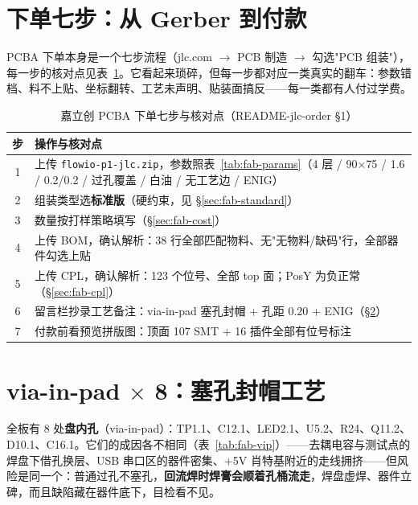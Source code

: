\section{下单七步：从 Gerber 到付款}
\label{sec:fab-steps}

PCBA 下单本身是一个七步流程（jlc.com $\to$ PCB 制造 $\to$ 勾选"PCB 组装"），每一步的核对点见表~\ref{tab:fab-steps}。它看起来琐碎，但每一步都对应一类真实的翻车：参数错档、料不上贴、坐标翻转、工艺未声明、贴装面搞反——每一类都有人付过学费。

\begin{table}[htbp]
  \centering
  \caption{嘉立创 PCBA 下单七步与核对点（README-jlc-order \S1）}
  \label{tab:fab-steps}
  \begin{tabular}{cp{9.6cm}}
    \toprule
    步 & 操作与核对点 \\
    \midrule
    1 & 上传 \texttt{flowio-p1-jlc.zip}，参数照表~\ref{tab:fab-params}（4 层 / 90$\times$75 / 1.6 / 0.2/0.2 / 过孔覆盖 / 白油 / 无工艺边 / ENIG） \\
    2 & 组装类型选\textbf{标准版}（硬约束，见 \S\ref{sec:fab-standard}） \\
    3 & 数量按打样策略填写（\S\ref{sec:fab-cost}） \\
    4 & 上传 BOM，确认解析：38 行全部匹配物料、无"无物料/缺码"行，全部器件勾选上贴 \\
    5 & 上传 CPL，确认解析：123 个位号、全部 top 面；PosY 为负正常（\S\ref{sec:fab-cpl}） \\
    6 & 留言栏抄录工艺备注：via-in-pad 塞孔封帽 + 孔距 0.20 + ENIG（\S\ref{sec:fab-vip}） \\
    7 & 付款前看预览拼版图：顶面 107 SMT + 16 插件全部有位号标注 \\
    \bottomrule
  \end{tabular}
\end{table}

\section{via-in-pad $\times$ 8：塞孔封帽工艺}
\label{sec:fab-vip}

全板有 8 处\textbf{盘内孔}（via-in-pad）：TP1.1、C12.1、LED2.1、U5.2、R24、Q11.2、D10.1、C16.1。它们的成因各不相同（表~\ref{tab:fab-vip}）——去耦电容与测试点的焊盘下借孔换层、USB 串口区的器件密集、+5V 肖特基附近的走线拥挤——但风险是同一个：普通过孔不塞孔，\textbf{回流焊时焊膏会顺着孔桶流走}，焊盘虚焊、器件立碑，而且缺陷藏在器件底下，目检看不见。

